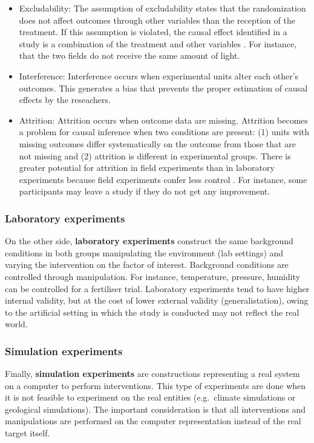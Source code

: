 \documentclass[
  12pt,
]{book}
\begin{document}
\begin{itemize}
\item
  Excludability: The assumption of excludability states that the randomization does not affect outcomes through other variables than the reception of the treatment. If this assumption is violated, the causal effect identified in a study is a combination of the treatment and other variables \citep{hansen2020systematic}. For instance, that the two fields do not receive the same amount of light.
\item
  Interference: Interference occurs when experimental units alter each other's outcomes. This generates a bias that prevents the proper estimation of causal effects by the reseachers.
\item
  Attrition: Attrition occurs when outcome data are missing. Attrition becomes a problem for causal inference when two conditions are present: (1) units with missing outcomes differ systematically on the outcome from those that are not missing and (2) attrition is different in experimental groups. There is greater potential for attrition in field experiments than in laboratory experiments because field experiments confer less control \citep{hansen2020systematic}. For instance, some participants may leave a study if they do not get any improvement.
\end{itemize}

\subsubsection{Laboratory experiments}\label{laboratory-experiments}

On the other side, \textbf{laboratory experiments} construct the same background conditions in both groups manipulating the environment (lab settings) and varying the intervention on the factor of interest. Background conditions are controlled through manipulation. For instance, temperature, pressure, humidity can be controlled for a fertiliser trial. Laboratory experiments tend to have higher internal validity, but at the cost of lower external validity (generalistation), owing to the artificial setting in which the study is conducted may not reflect the real world.

\subsubsection{Simulation experiments}\label{simulation-experiments}

Finally, \textbf{simulation experiments} are constructions representing a real system on a computer to perform interventions. This type of experiments are done when it is not feasible to experiment on the real entities (e.g.~climate simulations or geological simulations). The important consideration is that all interventions and manipulations are performed on the computer representation instead of the real target itself.
\end{document}
